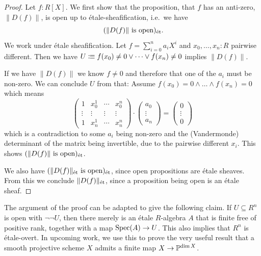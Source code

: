 \begin{proof}
  Let \(f:R[X]\).
  We first show that the proposition, that \(f\) has an anti-zero, \(\|D(f)\|\),
  is open up to étale-sheafification, i.e.\ we have
  \[
    (\|D(f)\| \text{ is open})_{\et}\rlap{.}
  \]
  We work under étale sheafification.
    Let \(f=\sum_{i=0}^na_iX^i\) and \(x_0,\dots,x_n:R\) pairwise different.
    Then we have \(U\colonequiv f(x_0)\neq 0\vee\dots\vee f(x_n)\neq 0\) implies \(\|D(f)\|\).

    If we have \(\|D(f)\|\) we know \(f\neq 0\) and therefore that one of the \(a_i\) must be non-zero.
    We can conclude \(U\) from that:
    Assume \(f(x_0)=0\wedge\dots\wedge f(x_n)=0\) which means
    \[
      \left(
        \begin{array}{cccc}
          1 & x_0^1 & \cdots & x_0^n \\
          \vdots & \vdots & \vdots & \vdots  \\
          1 & x_n^1 & \cdots & x_n^n
        \end{array}
      \right) \cdot
      \left(
        \begin{array}{c}
          a_0 \\
          \vdots \\
          a_n
        \end{array}
      \right) =
      \left(
        \begin{array}{c}
          0 \\
          \vdots \\
          0
        \end{array}
      \right)
    \]
    which is a contradiction to some \(a_i\) being non-zero
    and the (Vandermonde) determinant of the matrix being invertible,
    due to the pairwise different \(x_i\).
    This shows \((\|D(f)\| \text{ is open})_{\et}\).

    We also have \((\|D(f)\|_\et \text{ is open})_{\et}\),
    since open propositions are étale sheaves.
    From this we conclude \(\|D(f)\|_\et\),
    since a proposition being open is an étale sheaf.
\end{proof}

\begin{remark}
  The argument of the proof can be adapted to give the following claim.
  If $U \subseteq R^n$ is open with $\neg\neg U$, then there merely is an étale $R$-algebra $A$ that is finite free of positive rank, together with a map $\Spec(A) \to U$.
  This also implies that $R^n$ is étale-overt.
  In upcoming work, we use this to prove the very useful result that a smooth projective scheme $X$ admits a finite map $X \to \bP^{\dim X}$.
\end{remark}

